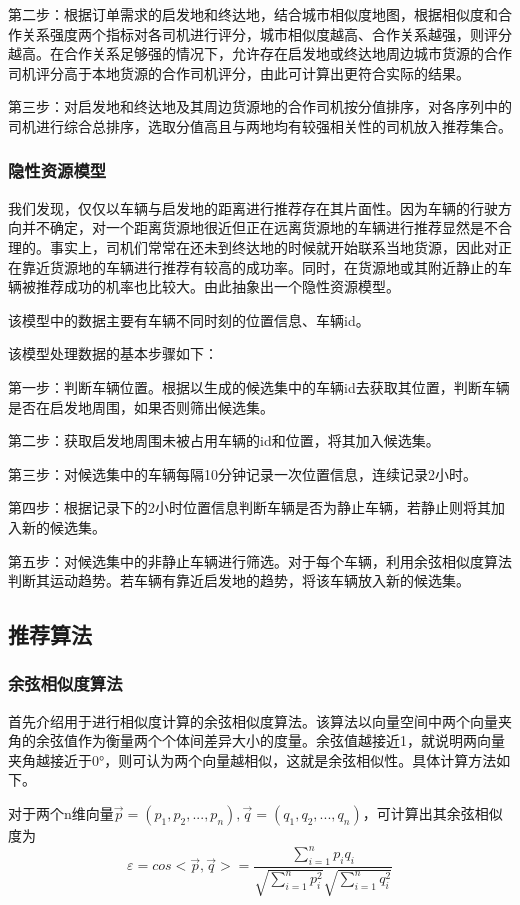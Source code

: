\documentclass[UTF8]{ctexart}
\begin{document}
\begin{multicols}{2}
第二步：根据订单需求的启发地和终达地，结合城市相似度地图，根据相似度和合作关系强度两个指标对各司机进行评分，城市相似度越高、合作关系越强，则评分越高。在合作关系足够强的情况下，允许存在启发地或终达地周边城市货源的合作司机评分高于本地货源的合作司机评分，由此可计算出更符合实际的结果。

第三步：对启发地和终达地及其周边货源地的合作司机按分值排序，对各序列中的司机进行综合总排序，选取分值高且与两地均有较强相关性的司机放入推荐集合。
\subsubsection{隐性资源模型}

我们发现，仅仅以车辆与启发地的距离进行推荐存在其片面性。因为车辆的行驶方向并不确定，对一个距离货源地很近但正在远离货源地的车辆进行推荐显然是不合理的。事实上，司机们常常在还未到终达地的时候就开始联系当地货源，因此对正在靠近货源地的车辆进行推荐有较高的成功率。同时，在货源地或其附近静止的车辆被推荐成功的机率也比较大。由此抽象出一个隐性资源模型。

该模型中的数据主要有车辆不同时刻的位置信息、车辆id。

该模型处理数据的基本步骤如下：

第一步：判断车辆位置。根据以生成的候选集中的车辆id去获取其位置，判断车辆是否在启发地周围，如果否则筛出候选集。

第二步：获取启发地周围未被占用车辆的id和位置，将其加入候选集。

第三步：对候选集中的车辆每隔10分钟记录一次位置信息，连续记录2小时。

第四步：根据记录下的2小时位置信息判断车辆是否为静止车辆，若静止则将其加入新的候选集。

第五步：对候选集中的非静止车辆进行筛选。对于每个车辆，利用余弦相似度算法判断其运动趋势。若车辆有靠近启发地的趋势，将该车辆放入新的候选集。
\subsection{推荐算法}
\subsubsection{余弦相似度算法}
首先介绍用于进行相似度计算的余弦相似度算法。该算法以向量空间中两个向量夹角的余弦值作为衡量两个个体间差异大小的度量。余弦值越接近1，就说明两向量夹角越接近于0°，则可认为两个向量越相似，这就是余弦相似性。具体计算方法如下。

对于两个n维向量$\vec{p}=(p_1,p_2,...,p_n),\vec{q}=(q_1,q_2,...,q_n)$，可计算出其余弦相似度为$$\varepsilon=cos<\vec{p},\vec{q}>= \frac{\sum\limits_{i=1}^{n}p_i q_i}{\sqrt{\sum\limits_{i=1}^{n}p_i^2}\sqrt{\sum\limits_{i=1}^{n}q_i^2}} $$


\end{multicols}
\end{document}
